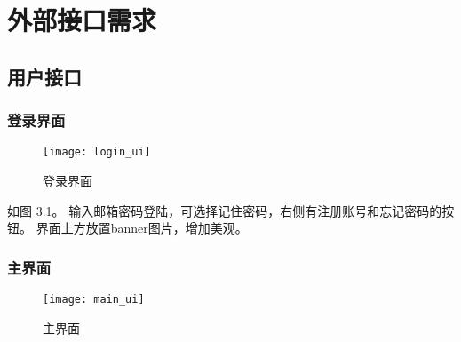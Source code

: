 \section{外部接口需求}
\subsection{用户接口}
% 
% 
% 
% 
% 


\subsubsection{登录界面}

\begin{figure}[h]
	\centering
	\texttt{[image: login\_ui]}
	\caption{登录界面} \label{fig:login_ui}
\end{figure}


如图 3.1。
输入邮箱密码登陆，可选择记住密码，右侧有注册账号和忘记密码的按钮。
界面上方放置banner图片，增加美观。

\subsubsection{主界面}
\begin{figure}[h]
	\centering
	\texttt{[image: main\_ui]}
	\caption{主界面} \label{fig:main_ui}
\end{figure}

